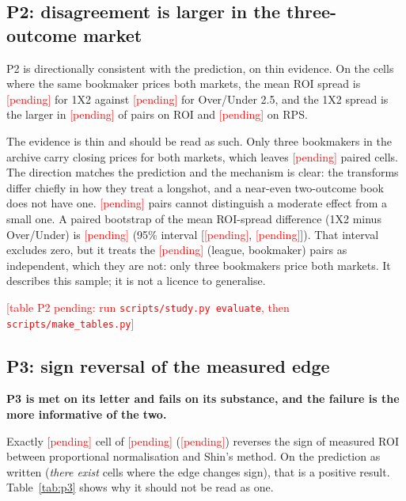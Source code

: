 \documentclass[11pt,a4paper]{article}
\newcommand{\inputtable}[1]{%
  {\small\setlength{\tabcolsep}{4.5pt}}%
}
\newcommand{\TBD}{\textcolor{red}{[pending]}}
\newcommand{\pendingtable}[1]{%
  \begin{center}\textcolor{red}{[table #1 pending: run \texttt{scripts/study.py evaluate},
  then \texttt{scripts/make\_tables.py}]}\end{center}}
\providecommand{\NCells}{\TBD}
\providecommand{\SpreadOneXTwo}{\TBD}
\providecommand{\SpreadOverUnder}{\TBD}
\providecommand{\NSignFlips}{\TBD}
\providecommand{\PctSignFlips}{\TBD}
\providecommand{\NPairedCells}{\TBD}
\providecommand{\ShareOneXTwoRoi}{\TBD}
\providecommand{\ShareOneXTwoRps}{\TBD}
\providecommand{\PairRoiDiff}{\TBD}
\providecommand{\PairRoiDiffLow}{\TBD}
\providecommand{\PairRoiDiffHigh}{\TBD}
\begin{document}
\subsection{P2: disagreement is larger in the three-outcome market}

P2 is directionally consistent with the prediction, on thin evidence. On the
cells where the same bookmaker prices both
markets, the mean ROI spread is \SpreadOneXTwo{} for 1X2 against
\SpreadOverUnder{} for Over/Under 2.5, and the 1X2 spread is the larger in
\ShareOneXTwoRoi{} of pairs on ROI and \ShareOneXTwoRps{} on RPS.

The evidence is thin and should be read as such. Only three bookmakers in the
archive carry closing prices for both markets, which leaves \NPairedCells{} paired
cells. The direction matches the prediction and the mechanism is clear: the
transforms differ chiefly in how they treat a longshot, and a near-even
two-outcome book does not have one. \NPairedCells{} pairs cannot distinguish a
moderate effect from a small one. A paired bootstrap of the mean ROI-spread
difference (1X2 minus Over/Under) is \PairRoiDiff{} (95\% interval
[\PairRoiDiffLow{}, \PairRoiDiffHigh{}]). That interval excludes zero, but it
treats the \NPairedCells{} (league, bookmaker) pairs as independent, which they
are not: only three bookmakers price both markets. It describes this sample;
it is not a licence to generalise.

\begin{table}[ht]
  \centering
  \caption{Transform disagreement by market, on cells where both markets are
  available from the same bookmaker.}
  \label{tab:p2}
    {\inputtable{generated/tab-p2.tex}}
    {\pendingtable{P2}}
\end{table}

\subsection{P3: sign reversal of the measured edge}

\textbf{P3 is met on its letter and fails on its substance, and the failure is
the more informative of the two.}

Exactly \NSignFlips{} cell of \NCells{} (\PctSignFlips{}) reverses the sign of
measured ROI between proportional normalisation and Shin's method. On the
prediction as written (\emph{there exist} cells where the edge changes
sign), that is a positive result. Table~\ref{tab:p3} shows why it should not
be read as one.
\end{document}

